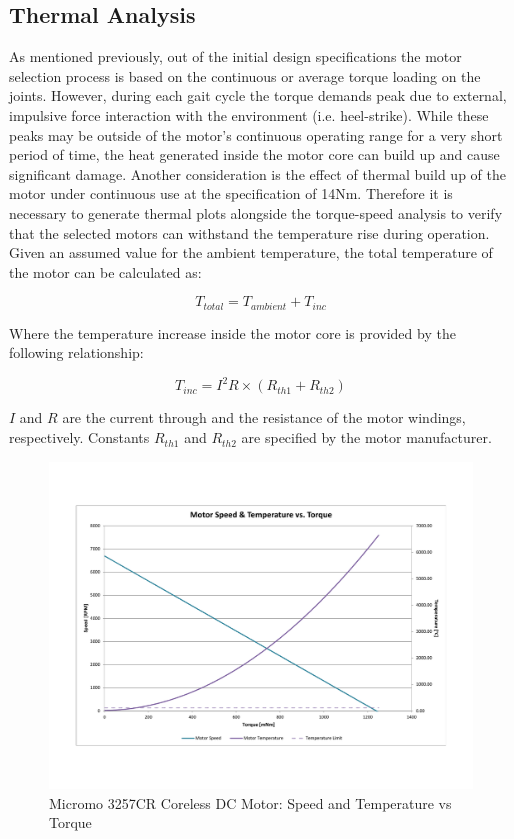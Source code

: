 \subsection{Thermal Analysis} %
\label{sub:thermal_analysis}
As mentioned previously, out of the initial design specifications the motor selection process is based on the continuous or average torque loading on the joints. However, during each gait cycle the torque demands peak due to external, impulsive force interaction with the environment (i.e. heel-strike). While these peaks may be outside of the motor's continuous operating range for a very short period of time, the heat generated inside the motor core can build up and cause significant damage. Another consideration is the effect of thermal build up of the motor under continuous use at the specification of 14Nm. Therefore it is necessary to generate thermal plots alongside the torque-speed analysis to verify that the selected motors can withstand the temperature rise during operation. Given an assumed value for the ambient temperature, the total temperature of the motor can be calculated as: 

\begin{equation}
	T_{total} = T_{ambient} + T_{inc}
\end{equation}

Where the temperature increase inside the motor core is provided by the following relationship: 

\begin{equation}
	T_{inc} = I^{2}R \times (R_{th1} + R_{th2})
\end{equation}

$I$ and $R$ are the current through and the resistance of the motor windings, respectively. Constants $R_{th1}$ and $R_{th2}$ are specified by the motor manufacturer. 


\begin{figure}[!ht]
	\begin{center}
    \includegraphics[trim = 20mm 30mm 20mm 30mm,clip,width=15cm]{fig/design/motor3.pdf}
	\end{center}
  \caption{Micromo 3257CR Coreless DC Motor: Speed and Temperature vs Torque}
\end{figure}

